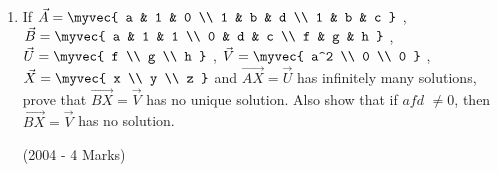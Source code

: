 \begin{enumerate}
	\item If $\vec{A} = \myvec{
			a & 1 & 0 \\
			1 & b & d \\
			1 & b & c }$ ,
		$\vec{B} = \myvec{
			a & 1 & 1 \\
			0 & d & c \\
			f & g & h }$ ,
		$\vec{U} = \myvec{
			f \\
			g \\
			h }$ ,
		$\vec{V} = \myvec{
			a^2 \\
			0 \\
			0 }$ ,
		$\vec{X} = \myvec{
			x \\
			y \\
			z }$
		and $\vec{AX}=\vec{U}$ has infinitely many solutions, prove that $\vec{BX}=\vec{V}$ has no unique solution. Also show that if $afd$ $\neq0$, then $\vec{BX}=\vec{V}$ has no solution.

		\hfill(2004 - 4 Marks)



\end{enumerate}
